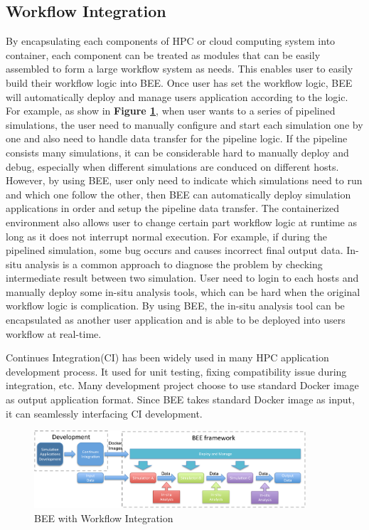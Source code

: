 \subsection{Workflow Integration}
By encapsulating each components of HPC or cloud computing system into container, each component can be treated as modules that can be easily assembled to form a large workflow system as needs. This enables user to easily build their workflow logic into BEE. Once user has set the workflow logic, BEE will automatically deploy and manage users application according to the logic. For example, as show in \textbf{Figure \ref{workflow}}, when user wants to a series of pipelined simulations, the user need to manually configure and start each simulation one by one and also need to handle data transfer for the pipeline logic. If the pipeline consists many simulations, it can be considerable hard to manually deploy and debug, especially when different simulations are conduced on different hosts. However, by using BEE, user only need to indicate which simulations need to run and which one follow the other, then BEE can automatically deploy simulation applications in order and setup the pipeline data transfer. The containerized environment also allows user to change certain part workflow logic at runtime as long as it does not interrupt normal execution. For example, if during the pipelined simulation, some bug occurs and causes incorrect final output data. In-situ analysis is a common approach to diagnose the problem by checking intermediate result between two simulation. User need to login to each hosts and manually deploy some in-situ analysis tools, which can be hard when the original workflow logic is complication. By using BEE, the in-situ analysis tool can be encapsulated as another user application and is able to be deployed into users workflow at real-time.

Continues Integration(CI) \cite{fowler2006continuous} has been widely used in many HPC application development process. It used for unit testing, fixing compatibility issue during integration, etc. Many development project choose to use standard Docker image as output application format. Since BEE takes standard Docker image as input, it can seamlessly interfacing CI development.
\begin{figure}[h]
    \centering
    \caption{BEE with Workflow Integration}
    \label{workflow}
    \includegraphics[width=0.9\textwidth]{figures/workflow.pdf}
\end{figure}


